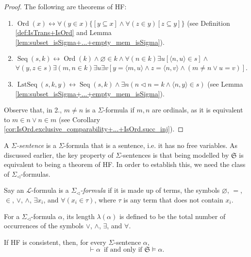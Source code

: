 \begin{proof}
    The following are theorems of HF:
    \begin{enumerate}
        \item $\operatorname{Ord}(x) \leftrightarrow 
        \forall(y \in x)\{[y \subseteq x] \land \forall(z \in y)[z \subseteq y]\}$ (see 
        Definition \ref{def:IsTrans+IsOrd} and 
        Lemma \ref{lem:subset_isSigma+...+empty_mem_isSigma}).
        \item $\operatorname{Seq}(s, k) \leftrightarrow \operatorname{Ord}(k) 
            \land \varnothing \in k \land \forall(n \in k) \exists u[\langle n, u\rangle \in s] 
            \land$
            $\forall(y, z \in s) \exists(m, n \in k) \exists u \exists v[y=\langle m, u\rangle 
            \land z=\langle n, v\rangle \land(m \neq n \lor u=v)]$.
        \item $\operatorname{LstSeq}(s, k, y) \leftrightarrow \operatorname{Seq}(s, k) 
            \land \exists n(n \lhd n=k \land\langle n, y\rangle \in s)$ 
            (see Lemma \ref{lem:subset_isSigma+...+empty_mem_isSigma}).
    \end{enumerate}
    Observe that, in 2., $m \neq n$ is a $\Sigma$-formula if $m,n$ are ordinals, as
    it is equivalent to $m \in n \lor n \in m$ 
    (see Corollary \ref{cor:IsOrd.exclusive_comparability+...+IsOrd.succ_inj}).
\end{proof}

A \textit{$\Sigma$-sentence} is a $\Sigma$-formula that is a sentence, 
i.e. it has no free variables. 
As discussed earlier, the key property of $\Sigma$-sentences is that 
being modelled by $\mathfrak{S}$ is equivalent to being a theorem of HF.
In order to establish this, we need the class of $\Sigma_{\lhd}$-formulas.

\begin{definition}
    \label{def:IsSigma_lhd}
    Say an $\mathcal{L}$-formula is a \textit{$\Sigma_{\lhd}$-formula} if it is made up
    of terms, the symbols ${\varnothing}$, ${=}$, ${\in}$, ${\lor}$, ${\land}$, ${\exists x_i}$,
    and ${\forall(x_i \in \tau)}$, where $\tau$ is any term that does not contain $x_i$.

    For a $\Sigma_{\lhd}$-formula $\alpha$, its length $\lambda(\alpha)$ is defined to be 
    the total number of occurrences of the symbols $\lor$, $\land$, $\exists$, and $\forall$.
\end{definition}

\begin{theorem}
    \label{thm:stdModel.prf_iff_models}
    If HF is consistent, then, for every $\Sigma$-sentence $\alpha$, 
    $$
    \vdash \alpha \,\text{ if and only if } 
    \mathfrak{S} \vDash \alpha.
    $$
\end{theorem}

